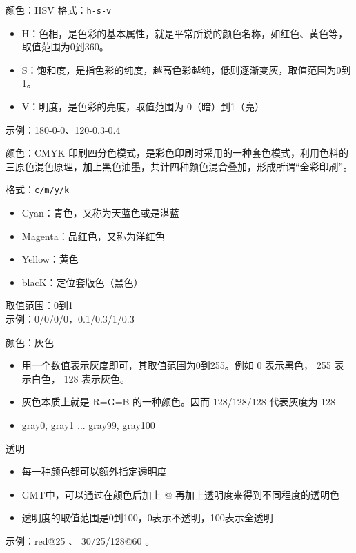 \documentclass[UTF8, 11pt]{ctexbeamer}
\begin{document}
\begin{frame}[fragile]{颜色：HSV}
格式：\verb|h-s-v|
\begin{itemize}
\item H：色相，是色彩的基本属性，就是平常所说的颜色名称，如红色、黄色等，取值范围为0到360。
\item S：饱和度，是指色彩的纯度，越高色彩越纯，低则逐渐变灰，取值范围为0到1。
\item V：明度，是色彩的亮度，取值范围为 0（暗）到1（亮）
\end{itemize}
示例：180-0-0、120-0.3-0.4
\end{frame}

\begin{frame}[fragile]{颜色：CMYK}
印刷四分色模式，是彩色印刷时采用的一种套色模式，利用色料的三原色混色原理，加上黑色油墨，共计四种颜色混合叠加，形成所谓“全彩印刷”。

格式：\verb|c/m/y/k| \\
\begin{itemize}
\item Cyan：青色，又称为天蓝色或是湛蓝
\item Magenta：品红色，又称为洋红色
\item Yellow：黄色
\item blacK：定位套版色（黑色）
\end{itemize}

取值范围：0到1 \\
示例：0/0/0/0，0.1/0.3/1/0.3
\end{frame}

\begin{frame}[fragile]{颜色：灰色}
\begin{itemize}
\item 用一个数值表示灰度即可，其取值范围为0到255。例如 0 表示黑色， 255 表示白色， 128 表示灰色。
\item 灰色本质上就是 R=G=B 的一种颜色。因而 128/128/128 代表灰度为 128
\item gray0, gray1 ... gray99, gray100
\end{itemize}
\end{frame}

\begin{frame}{透明}
\begin{itemize}
\item 每一种颜色都可以额外指定透明度
\item GMT中，可以通过在颜色后加上 @ 再加上透明度来得到不同程度的透明色
\item 透明度的取值范围是0到100，0表示不透明，100表示全透明
\end{itemize}

示例：red@25 、 30/25/128@60 。
\end{frame}
\end{document}
